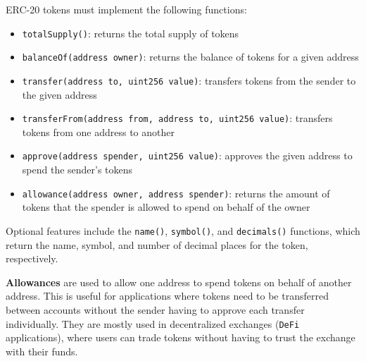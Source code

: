 ERC-20 tokens must implement the following functions:
\begin{itemize}
   \item \texttt{totalSupply()}: returns the total supply of tokens
   \item \texttt{balanceOf(address owner)}: returns the balance of tokens for a given address
   \item \texttt{transfer(address to, uint256 value)}: transfers tokens from the sender to the given address
   \item \texttt{transferFrom(address from, address to, uint256 value)}: transfers tokens from one address to another
   \item \texttt{approve(address spender, uint256 value)}: approves the given address to spend the sender's tokens
   \item \texttt{allowance(address owner, address spender)}: returns the amount of tokens that the spender is allowed to spend on behalf of the owner
\end{itemize}

Optional features include the \texttt{name()}, \texttt{symbol()}, and \texttt{decimals()} functions, which return the name, symbol, and number of decimal places for the token, respectively.
\nl

\textbf{Allowances} are used to allow one address to spend tokens on behalf of another address. This is useful for applications where tokens need to be transferred between accounts without the sender having to approve each transfer individually.
They are mostly used in decentralized exchanges (\texttt{DeFi} applications), where users can trade tokens without having to trust the exchange with their funds.

